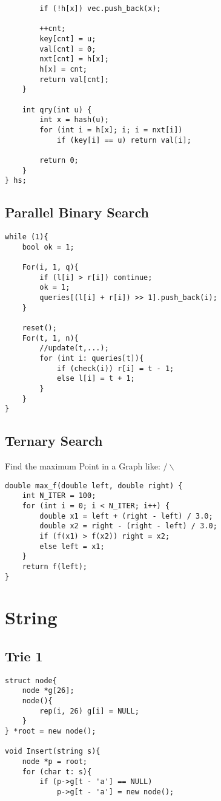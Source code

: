 \documentclass[11pt,a4paper]{article}
\begin{document}
\begin{multicols*}{2}
\begin{lstlisting}
        if (!h[x]) vec.push_back(x);
 
        ++cnt;
        key[cnt] = u;
        val[cnt] = 0;
        nxt[cnt] = h[x];
        h[x] = cnt;
        return val[cnt];
    }
    
    int qry(int u) {
        int x = hash(u);
        for (int i = h[x]; i; i = nxt[i])
            if (key[i] == u) return val[i];
 
        return 0;
    }
} hs;
\end{lstlisting}

\subsection{Parallel Binary Search}
\begin{lstlisting}
while (1){
    bool ok = 1;

    For(i, 1, q){
        if (l[i] > r[i]) continue;
        ok = 1;
        queries[(l[i] + r[i]) >> 1].push_back(i);
    }

    reset();
    For(t, 1, n){
        //update(t,...);
        for (int i: queries[t]){
            if (check(i)) r[i] = t - 1;
            else l[i] = t + 1;
        }
    }
}
\end{lstlisting}

\subsection{Ternary Search}
Find the maximum Point in a Graph like: $\slash\backslash$
\begin{lstlisting}
double max_f(double left, double right) {
    int N_ITER = 100;
    for (int i = 0; i < N_ITER; i++) {
        double x1 = left + (right - left) / 3.0;
        double x2 = right - (right - left) / 3.0;
        if (f(x1) > f(x2)) right = x2;
        else left = x1;
    }
    return f(left);
}    
\end{lstlisting}
\section {String}
\subsection{Trie 1}
\begin{lstlisting}
struct node{
	node *g[26];
	node(){
		rep(i, 26) g[i] = NULL;
	}
} *root = new node();

void Insert(string s){
	node *p = root;
	for (char t: s){
		if (p->g[t - 'a'] == NULL)
			p->g[t - 'a'] = new node();
		

\end{lstlisting}
\end{multicols*}
\end{document}
